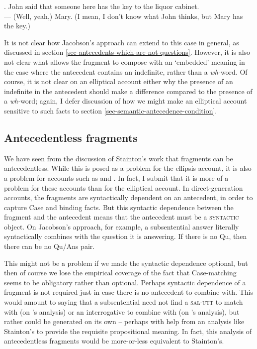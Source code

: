 \documentclass[doublespace]{umthesis}
\begin{document}
\ex. 	John said that someone here has the key to the liquor cabinet.\\
	--- (Well, yeah,) Mary. (I mean, I don't know what John thinks, but Mary has the key.)
	
It is not clear how Jacobson's approach can extend to this case in general, as discussed in section \ref{sec-antecedents-which-are-not-questions}. However, it is also not clear what allows the fragment to compose with an `embedded' meaning in the case where the antecedent contains an indefinite, rather than a {\it wh-}word. Of course, it is not clear on an elliptical account either why the presence of an indefinite in the antecedent should make a difference compared to the presence of a {\it wh-}word; again, I defer discussion of how we might make an elliptical account sensitive to such facts to section \ref{sec-semantic-antecedence-condition}.

\subsection{Antecedentless fragments}\label{sec-antecedentless-fragments}

We have seen from the discussion of Stainton's work that fragments can be antecedentless. While this is posed as a problem for the ellipsis account, it is also a problem for accounts such as \cite{GS00} and \cite{Ja13}. In fact, I submit that it is more of a problem for these accounts than for the elliptical account. In direct-generation accounts, the fragments are syntactically dependent on an antecedent, in order to capture Case and binding facts. But this syntactic dependence between the fragment and the antecedent means that the antecedent must be a \textsc{syntactic} object. On Jacobson's approach, for example, a subsentential answer literally syntactically combines with the question it is answering. If there is no Qu, then there can be no Qu/Ans pair.

This might not be a problem if we made the syntactic dependence optional, but then of course we lose the empirical coverage of the fact that Case-matching seems to be obligatory rather than optional. Perhaps syntactic dependence of a fragment is not required just in case there is no antecedent to combine with. This would amount to saying that a subsentential need not find a \textsc{sal-utt} to match with (on \cite{GS00}'s analysis) or an interrogative to combine with (on \cite{Ja13}'s analysis), but rather could be generated on its own -- perhaps with help from an analysis like Stainton's to provide the requisite propositional meaning. In fact, this analysis of antecedentless fragments would be more-or-less equivalent to Stainton's.
\end{document}
